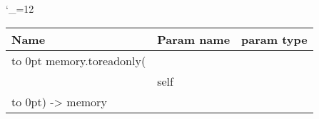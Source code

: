 \begingroup \catcode`\_=12 \tt
\begin{tabular}{lll}
\toprule
\textrm{Name}&\textrm{Param name}&\textrm{param type}\\
\midrule
\hbox to 0pt {memory.toreadonly(\hss}\\
& self\\
\hbox to 0pt{) -> memory\hss}\\
\bottomrule
\end{tabular}
\endgroup
